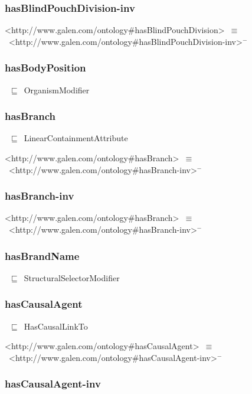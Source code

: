 \documentclass{article}
\begin{document}
\subsubsection*{hasBlindPouchDivision-inv}

<http://www.galen.com/ontology#hasBlindPouchDivision>~\ensuremath{\equiv}~<http://www.galen.com/ontology#hasBlindPouchDivision-inv>\ensuremath{^-}

\subsubsection*{hasBodyPosition}

~\ensuremath{\sqsubseteq}~OrganismModifier

\subsubsection*{hasBranch}

~\ensuremath{\sqsubseteq}~LinearContainmentAttribute

<http://www.galen.com/ontology#hasBranch>~\ensuremath{\equiv}~<http://www.galen.com/ontology#hasBranch-inv>\ensuremath{^-}

\subsubsection*{hasBranch-inv}

<http://www.galen.com/ontology#hasBranch>~\ensuremath{\equiv}~<http://www.galen.com/ontology#hasBranch-inv>\ensuremath{^-}

\subsubsection*{hasBrandName}

~\ensuremath{\sqsubseteq}~StructuralSelectorModifier

\subsubsection*{hasCausalAgent}

~\ensuremath{\sqsubseteq}~HasCausalLinkTo

<http://www.galen.com/ontology#hasCausalAgent>~\ensuremath{\equiv}~<http://www.galen.com/ontology#hasCausalAgent-inv>\ensuremath{^-}

\subsubsection*{hasCausalAgent-inv}
\end{document}
